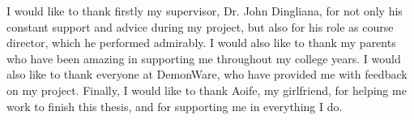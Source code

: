 \documentclass[a4paper, 12pt, oneside]{report}         %
\begin{document}

\thesistitlepage                                  %

\thesisdeclarationpage                %

\thesispermissionpage                 %


\begin{thesisacknowledgments}                     %
I would like to thank firstly my supervisor, Dr. John Dingliana, for not only his constant support and advice during my project, but also for his role as course director, which he performed admirably.
I would also like to thank my parents who have been amazing in supporting me throughout my college years.
I would also like to thank everyone at DemonWare, who have provided me with feedback on my project.
Finally, I would like to thank Aoife, my girlfriend, for helping me work to finish this thesis, and for supporting me in everything I do.
\end{thesisacknowledgments}                       %

\begin{thesisabstract}

\end{thesisabstract}

\tableofcontents                                  %
\listoftables                                     %
\listoffigures                                    %

  
  
  
  
  
  

\begin{appendix}
 
% 
\end{appendix}



\end{document}
